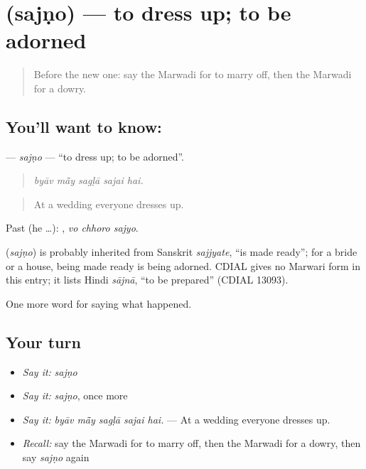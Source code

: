 \section[\texorpdfstring{\mw{सजणो} (sajṇo)}{सजणो (sajṇo)}]{ (sajṇo) — to dress up; to be adorned}

\label{lesson:MW-C248-sajno}



\begin{quote}
Before the new one: say the Marwadi for to marry off, then the Marwadi for a dowry.
\end{quote}

\subsection*{You'll want to know: }
\textbf{} — \emph{sajṇo} — \textquotedblleft{}to dress up; to be adorned\textquotedblright{}.

\begin{quote}
    
\end{quote}

\begin{quote}
\emph{byāv mā̃y sagḷā sajai hai.}
\end{quote}

\begin{quote}
At a wedding everyone dresses up.
\end{quote}

Past (he …):   , \emph{vo chhoro sajyo}.

\begin{cousinweb}
\textbf{} (\emph{sajṇo}) is probably inherited from Sanskrit \emph{sajjyate}, \textquotedblleft{}is made ready\textquotedblright{}; for a bride or a house, being made ready is being adorned. CDIAL gives no Marwari form in this entry; it lists Hindi \emph{sājnā}, \textquotedblleft{}to be prepared\textquotedblright{} (CDIAL 13093).
\end{cousinweb}

\begin{grammarlens}[title={What you've built}]
One more word for saying what happened.
\end{grammarlens}

\subsection*{Your turn}
\begin{itemize}
\raggedright
  \item \emph{Say it:} \emph{sajṇo}
  \item \emph{Say it:} \emph{sajṇo}, once more
  \item \emph{Say it:} \emph{byāv mā̃y sagḷā sajai hai.} — At a wedding everyone dresses up.
  \item \emph{Recall:} say the Marwadi for to marry off, then the Marwadi for a dowry, then say \emph{sajṇo} again
\end{itemize}

